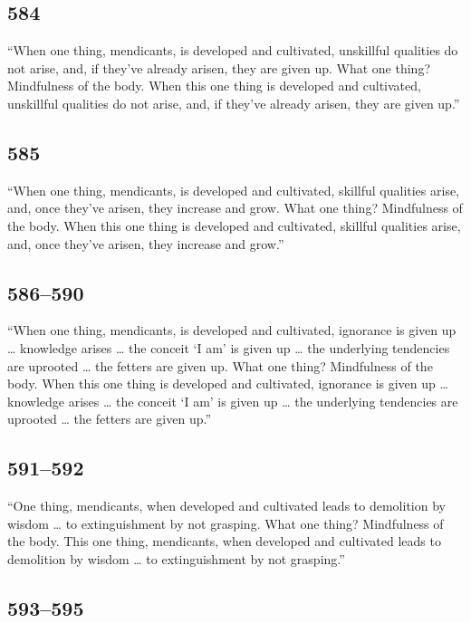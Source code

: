 \documentclass[12pt,openany]{book}%
\begin{document}
\subsection*{584 }

“When one thing, mendicants, is developed and cultivated, unskillful qualities do not arise, and, if they’ve already arisen, they are given up. What one thing? Mindfulness of the body. When this one thing is developed and cultivated, unskillful qualities do not arise, and, if they’ve already arisen, they are given up.” 

\subsection*{585 }

“When one thing, mendicants, is developed and cultivated, skillful qualities arise, and, once they’ve arisen, they increase and grow. What one thing? Mindfulness of the body. When this one thing is developed and cultivated, skillful qualities arise, and, once they’ve arisen, they increase and grow.” 

\subsection*{586–590 }

“When one thing, mendicants, is developed and cultivated, ignorance is given up … knowledge arises … the conceit ‘I am’ is given up … the underlying tendencies are uprooted … the fetters are given up. What one thing? Mindfulness of the body. When this one thing is developed and cultivated, ignorance is given up … knowledge arises … the conceit ‘I am’ is given up … the underlying tendencies are uprooted … the fetters are given up.” 

\subsection*{591–592 }

“One thing, mendicants, when developed and cultivated leads to demolition by wisdom … to extinguishment by not grasping. What one thing? Mindfulness of the body. This one thing, mendicants, when developed and cultivated leads to demolition by wisdom … to extinguishment by not grasping.” 

\subsection*{593–595 }
\end{document}
